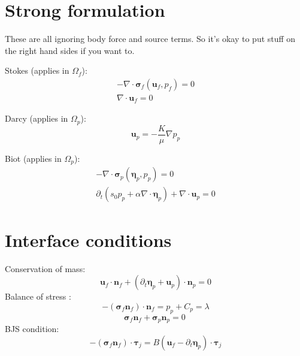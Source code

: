 \documentclass{article}
\newcommand{\mathspace}[1]{\ensuremath{#1}\xspace} %
\newcommand{\sigmabf}{\mathspace{\boldsymbol{\sigma}}}
\newcommand{\grad}{\mathspace{\nabla}}
\renewcommand{\div}{\mathspace{\nabla \cdot}}
\newcommand{\ddt}[1]{\mathspace{\partial_t #1}}
\newcommand{\taubf}{\mathspace{\boldsymbol{\tau}}}
\newcommand{\stokes}{\mathspace{\Omega_{f}}}
\newcommand{\darcy}{\mathspace{\Omega_{p}}}
\newcommand{\nf}{\mathspace{\mathbf{n}_f}}
\newcommand{\np}{\mathspace{\mathbf{n}_p}}
\newcommand{\uf}{\mathspace{\mathbf{u}_f}}
\newcommand{\up}{\mathspace{\mathbf{u}_p}}
\newcommand{\pf}{\mathspace{p_f}}
\newcommand{\pp}{\mathspace{p_p}}
\newcommand{\disp}{\mathspace{\boldsymbol{\eta}_p}}
\begin{document}
\section{Strong formulation}
These are all ignoring body force and source terms. So it's okay to put stuff on the right hand sides if you want to.

Stokes (applies in \stokes):
\begin{subequations}
  \begin{align}
    - \div \sigmabf_f (\uf, \pf) = 0    \label{eq:stokes_stress} \\
    \div \uf = 0    \label{eq:stokes_conservation}
  \end{align}
\end{subequations}

Darcy (applies in \darcy):
\begin{equation}
    \up = - \frac {K} {\mu} \grad \pp     \label{eq:darcy}
  \end{equation}

  
Biot (applies in \darcy):
\begin{subequations}
  \begin{align}
    - \div \sigmabf_p (\disp, \pp) = 0     \label{eq:biot_stress} \\
    \ddt{} \left ( s_0 \pp + \alpha \div \disp \right ) + \div \up = 0    \label{eq:biot_conservation}
  \end{align}
\end{subequations}
\section{Interface conditions}

Conservation of mass:
\begin{equation}
\uf  \cdot \nf + \left ( \ddt{\disp} + \up \right ) \cdot \np = 0  \label{eq:massconservation}
\end{equation}
Balance of stress :
\begin{equation}
  -(\sigmabf_f \nf) \cdot \nf = \pp + C_p = \lambda  \label{eq:stressbalance1_mult}
\end{equation}
\begin{equation}
  \sigmabf_f \nf + \sigmabf_p \np = 0 \:  \label{eq:stressbalance2}
\end{equation}
BJS condition:
\begin{equation}
  -(\sigmabf_f \nf) \cdot \taubf_j = B \left ( \uf - \ddt{\disp} \right ) \cdot \taubf_j
  \label{eq:BJS}
\end{equation}
\end{document}
